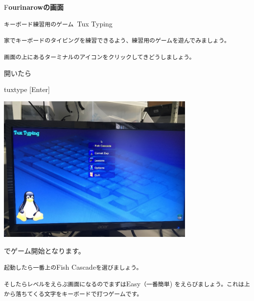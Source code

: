 \documentclass[a4paper,dvipdfmx]{jarticle}
\newcommand\textstyleqwerty[1]{#1}
\begin{document}
\bigskip


\bigskip


\bigskip


\bigskip

\textstyleqwerty{F\textbf{ourinarowの画面}}


\bigskip


\bigskip


\bigskip


\bigskip


\bigskip

\textstyleqwerty{\texttt{キーボード練習用のゲーム }Tux
Typing}


\bigskip

\textstyleqwerty{\texttt{家でキーボードのタイピングを練習できるよう、練習用のゲームを遊んでみましょう。}}

\textstyleqwerty{\texttt{画面の上にあるターミナルのアイコンをクリックしてきどうしましょう。}}

{\ttfamily
開いたら}


\bigskip

\textstyleqwerty{tuxtype [Enter]}



\begin{center}
\includegraphics[width=9.79cm,height=7.343cm]{text02-img/text02-img020.jpg}

\end{center}
でゲーム開始となります。

\textstyleqwerty{\texttt{起動したら一番上の}Fish
Cascade\texttt{を選びましょう。}}

\textstyleqwerty{\texttt{そしたらレベルをえらぶ画面になるのでまずは}Easy\texttt{（一番簡単})
\texttt{をえらびましょう。これは上から落ちてくる文字をキーボードで打つゲームです。}}


\bigskip
\end{document}

